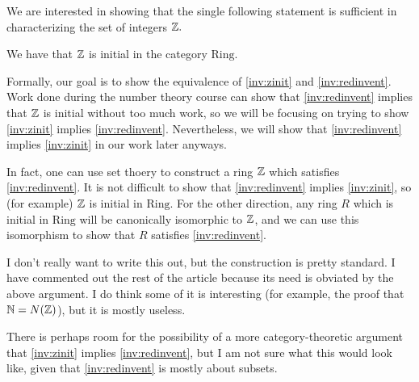 \documentclass{article}
\begin{document}
We are interested in showing that the single following statement is sufficient in characterizing the set of integers $\mathbb Z.$
\begin{inv} \label{inv:zinit}
	We have that $\mathbb Z$ is initial in the category $\mathrm{Ring}.$
\end{inv}
Formally, our goal is to show the equivalence of \autoref{inv:zinit} and \autoref{inv:redinvent}. Work done during the number theory course can show that \autoref{inv:redinvent} implies that $\mathbb Z$ is initial without too much work, so we will be focusing on trying to show \autoref{inv:zinit} implies \autoref{inv:redinvent}. Nevertheless, we will show that \autoref{inv:redinvent} implies \autoref{inv:zinit} in our work later anyways.
\begin{idea}
	In fact, one can use set thoery to construct a ring $\mathbb Z$ which satisfies \autoref{inv:redinvent}. It is not difficult to show that \autoref{inv:redinvent} implies \autoref{inv:zinit}, so (for example) $\mathbb Z$ is initial in $\mathrm{Ring}$. For the other direction, any ring $R$ which is initial in $\mathrm{Ring}$ will be canonically isomorphic to $\mathbb Z$, and we can use this isomorphism to show that $R$ satisfies \autoref{inv:redinvent}.
\end{idea}
I don't really want to write this out, but the construction is pretty standard. I have commented out the rest of the article because its need is obviated by the above argument. I do think some of it is interesting (for example, the proof that $\mathbb N=N(\mathbb Z)$), but it is mostly useless.

There is perhaps room for the possibility of a more category-theoretic argument that \autoref{inv:zinit} implies \autoref{inv:redinvent}, but I am not sure what this would look like, given that \autoref{inv:redinvent} is mostly about subsets.

\end{document}
